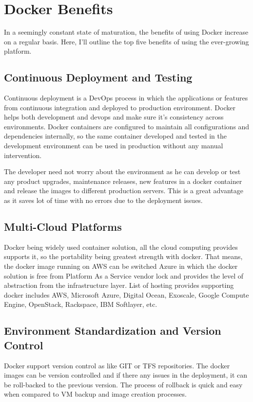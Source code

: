 \documentclass[sigconf]{acmart}
\begin{document}
	\section{Docker Benefits}
	In a seemingly constant state of maturation, the benefits of using Docker increase on a regular basis. Here, I'll outline the top five benefits of using the ever-growing platform. \cite{DockerBenefits}
	\subsection{Continuous Deployment and Testing}
	Continuous deployment is a DevOps process in which the applications or features from continuous integration and deployed to production environment.
	Docker helps both development and devops and make sure it's consistency across environments. Docker containers are configured to maintain all configurations and dependencies internally, so the same container developed and tested in the development environment can be used in production without any manual intervention.
	
	The developer need not worry about the environment as he can develop or test any product upgrades, maintenance releases, new features in a docker container and release the images to different production servers. This is a great advantage as it saves lot of time with no errors due to the deployment issues.\cite{Isolation}
	 
	\subsection{Multi-Cloud Platforms}
	Docker being widely used container solution, all the cloud computing provides supports it, so the portability being greatest strength with docker.
	That means, the docker image running on AWS can be switched Azure in which the docker solution is free from Platform As a Service vendor lock and provides the level of abstraction from the infrastructure layer.
	List of hosting provides supporting docker includes AWS, Microsoft Azure, Digital Ocean, Exoscale, Google Compute Engine, OpenStack, Rackspace, IBM Softlayer, etc.
	\cite{MultiCloudPlatform}
	\subsection{Environment Standardization and Version Control}
	Docker support version control as like GIT or TFS repositories. The docker images can be version controlled and if there any issues in the deployment, it can be roll-backed to the previous version. The process of rollback is quick and easy when compared to VM backup and image creation processes.\cite{Isolation}
\end{document}
